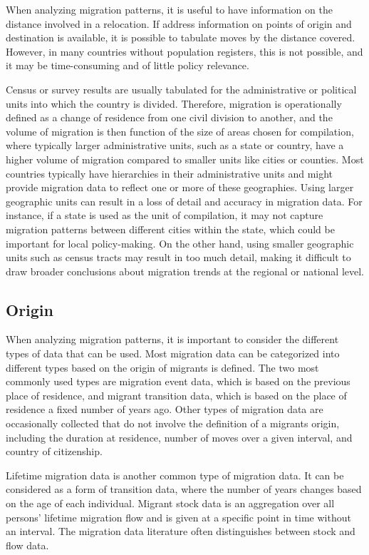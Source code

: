 \documentclass[
]{book}
\begin{document}
When analyzing migration patterns, it is useful to have information on the distance involved in a relocation. If address information on points of origin and destination is available, it is possible to tabulate moves by the distance covered. However, in many countries without population registers, this is not possible, and it may be time-consuming and of little policy relevance.

Census or survey results are usually tabulated for the administrative or political units into which the country is divided. Therefore, migration is operationally defined as a change of residence from one civil division to another, and the volume of migration is then function of the size of areas chosen for compilation, where typically larger administrative units, such as a state or country, have a higher volume of migration compared to smaller units like cities or counties. Most countries typically have hierarchies in their administrative units and might provide migration data to reflect one or more of these geographies. Using larger geographic units can result in a loss of detail and accuracy in migration data. For instance, if a state is used as the unit of compilation, it may not capture migration patterns between different cities within the state, which could be important for local policy-making. On the other hand, using smaller geographic units such as census tracts may result in too much detail, making it difficult to draw broader conclusions about migration trends at the regional or national level.

\hypertarget{origin}{%
\subsection{Origin}\label{origin}}

When analyzing migration patterns, it is important to consider the different types of data that can be used. Most migration data can be categorized into different types based on the origin of migrants is defined. The two most commonly used types are migration event data, which is based on the previous place of residence, and migrant transition data, which is based on the place of residence a fixed number of years ago. Other types of migration data are occasionally collected that do not involve the definition of a migrants origin, including the duration at residence, number of moves over a given interval, and country of citizenship.

Lifetime migration data is another common type of migration data. It can be considered as a form of transition data, where the number of years changes based on the age of each individual. Migrant stock data is an aggregation over all persons' lifetime migration flow and is given at a specific point in time without an interval. The migration data literature often distinguishes between stock and flow data.
\end{document}
